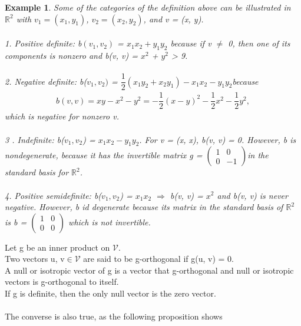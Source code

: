 \documentclass[12pt,a4paper]{article}
\newtheorem{exmp}{Example}[section]
\begin{document}
\begin{exmp}
Some of the categories of the definition above can be illustrated in $\mathbb{R}^2$ with $v_1 = (x_1, y_1)$, $v_2 = (x_2, y_2)$, and v = (x, y).\\\\
1. Positive definite: b$(v_1, v_2)$ = $x_1 x_2 + y_1 y_2$ because if v $\ne$ 0, then one of its components is nonzero and b(v, v) = $x^2$ + $y^2$ > 9. \\\\
2. Negative definite: b($v_1, v_2)$ = $\dfrac{1}{2}(x_1 y_2 + x_2 y_1) - x_1 x_2 - y_1 y_2 $because 
\begin{align*}
b(v, v) = x y - x^2 - y^2 = - \dfrac{1}{2}(x - y)^2 - \dfrac{1}{2}x^2 -\dfrac{1}{2} y^2,
\end{align*}
which is negative for nonzero v.
\\\\
3 . Indefinite: b($v_1,v_2$) = $x_1 x_2 - y_1 y_2$. For v = (x, x), b(v, v) = 0. However, b is nondegenerate, because it has the invertible matrix g = 
$\begin{pmatrix}
1 & 0 \\
0 & -1 
\end{pmatrix} $in the standard basis for $\mathbb{R}^2$.
\\\\
4. Positive semidefinite: b($v_1, v_2$) = $x_1 x_2$ $\Rightarrow$ b(v, v) = $x ^2$ and b(v, v) is never negative. However, b id degenerate because its matrix in the standard basis of $\mathbb{R}^2$ is b = 
$\begin{pmatrix}
1 & 0\\
0 & 0
\end{pmatrix}$
which is not invertible.
\end{exmp}
Let g be an inner product on $\mathcal{V}$. \\
Two vectors u, v$\in$$\mathcal{V}$ are said to be
g-orthogonal if g(u, v) = 0. \\A null or isotropic vector of g is a vector that
g-orthogonal and null or
isotropic vectors
is g-orthogonal to itself. \\If g is definite, then the only null vector is the zero
vector. \\\\The converse is also true, as the following proposition shows
\end{document}
